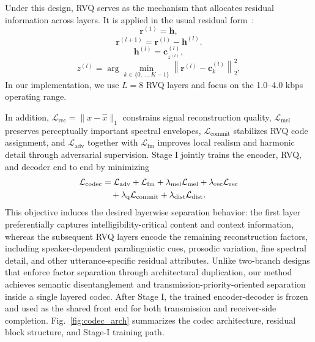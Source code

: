 \documentclass[conference]{IEEEtran}
\begin{document}
Under this design, RVQ serves as the mechanism that allocates residual information across layers. It is applied in the usual residual form~\cite{oord2017vqvae}:
\begin{equation}
\mathbf{r}^{(1)}=\mathbf{h},
\end{equation}
\begin{equation}
\mathbf{r}^{(l+1)}=\mathbf{r}^{(l)}-\mathbf{h}^{(l)}.
\end{equation}
\begin{equation}
\mathbf{h}^{(l)}=\mathbf{c}^{(l)}_{z^{(l)}},
\end{equation}
\begin{equation}
z^{(l)}=\arg\min_{k\in\{0,\ldots,K-1\}}\left\|\mathbf{r}^{(l)}-\mathbf{c}^{(l)}_k\right\|_2^2,
\end{equation}
In our implementation, we use $L=8$ RVQ layers and focus on the 1.0--4.0 kbps operating range.

In addition, $\mathcal{L}_{\mathrm{rec}}=\|x-\hat{x}\|_1$ constrains signal reconstruction quality, $\mathcal{L}_{\mathrm{mel}}$ preserves perceptually important spectral envelopes, $\mathcal{L}_{\mathrm{commit}}$ stabilizes RVQ code assignment, and $\mathcal{L}_{\mathrm{adv}}$ together with $\mathcal{L}_{\mathrm{fm}}$ improves local realism and harmonic detail through adversarial supervision. Stage I jointly trains the encoder, RVQ, and decoder end to end by minimizing
\begin{align}
\mathcal{L}_{\mathrm{codec}}&=\mathcal{L}_{\mathrm{adv}}+\mathcal{L}_{\mathrm{fm}}+
\lambda_{\mathrm{mel}}\mathcal{L}_{\mathrm{mel}}+\lambda_{\mathrm{rec}}\mathcal{L}_{\mathrm{rec}}\notag\\
&\quad+\lambda_{\mathrm{q}}\mathcal{L}_{\mathrm{commit}}+
\lambda_{\mathrm{dist}}\mathcal{L}_{\mathrm{dist}}.
\end{align}
This objective induces the desired layerwise separation behavior: the first layer preferentially captures intelligibility-critical content and context information, whereas the subsequent RVQ layers encode the remaining reconstruction factors, including speaker-dependent paralinguistic cues, prosodic variation, fine spectral detail, and other utterance-specific residual attributes. Unlike two-branch designs that enforce factor separation through architectural duplication, our method achieves semantic disentanglement and transmission-priority-oriented separation inside a single layered codec. After Stage I, the trained encoder-decoder is frozen and used as the shared front end for both transmission and receiver-side completion. Fig.~\ref{fig:codec_arch} summarizes the codec architecture, residual block structure, and Stage-I training path.
\end{document}
